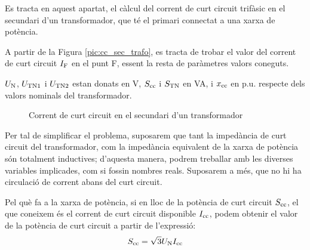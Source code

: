  Es tracta en aquest apartat, el c\`{a}lcul del corrent de curt
circuit trif\`{a}sic en el secundari d'un transformador, que t\'{e} el
primari connectat  a una xarxa de pot\`{e}ncia.

A partir de la Figura \vref{pic:cc_sec_trafo}, es tracta de trobar
el valor del corrent de curt circuit $I_\mathrm{F}$ en el punt F, essent
la resta de par\`{a}metres valors coneguts.

$U_\mathrm{N}$, $U_\mathrm{TN1}$ i $U_\mathrm{TN2}$ estan donats en V,
$S_\mathrm{cc}$ i $S_\mathrm{TN}$ en VA, i $x_\mathrm{cc}$ en p.u. respecte dels
valors nominals del transformador.

\begin{figure}[htb]
\vspace{3mm} \centering {} \caption{Corrent de curt circuit en el  secundari d'un
transformador} \label{pic:cc_sec_trafo}
\end{figure}

Per tal de simplificar el problema, suposarem que tant la imped\`{a}ncia
de curt circuit del transformador, com la imped\`{a}ncia equivalent de
la xarxa de pot\`{e}ncia s\'{o}n totalment inductives; d'aquesta manera,
podrem treballar amb les diverses variables implicades, com si
fossin nombres reals. Suposarem a m\'{e}s, que no hi ha circulaci\'{o} de
corrent abans del curt circuit.

Pel qu\`{e} fa a la xarxa de pot\`{e}ncia, si en lloc de la pot\`{e}ncia de curt
circuit $S_\mathrm{cc}$, el que coneixem \'{e}s el corrent de curt circuit
disponible $I_\mathrm{cc}$, podem obtenir el valor de la pot\`{e}ncia de
curt circuit a partir de l'expressi\'{o}:
\begin{equation}
    S_\mathrm{cc} = \sqrt{3} U_\mathrm{N} I_\mathrm{cc}
\end{equation}


